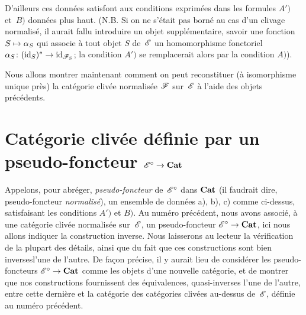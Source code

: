 D'ailleurs ces donn\'ees satisfont aux conditions exprim\'ees dans
les formules $A')$ et~$B)$ donn\'ees plus haut. (N.B. Si on ne
s'\'etait pas born\'e au cas d'un clivage normalis\'e, il aurait
fallu introduire un objet suppl\'ementaire, savoir une fonction
$S\mto \alpha_S$ qui associe \`a tout objet $S$ de~$\cal{E}$ un
homomorphisme fonctoriel $\alpha_S\colon (\id_S)^*\to
\id_{\cal{F}_S}$; la condition $A')$ se remplacerait alors par la
condition $A)$).

Nous
allons montrer maintenant comment on peut reconstituer (\`a
isomorphisme unique pr\`es) la cat\'egorie cliv\'ee
normalis\'ee $\cal{F}$ sur~$\cal{E}$ \`a l'aide des objets
pr\'ec\'edents.

\section[Cat\'egorie cliv\'ee d\'efinie par un pseudo-foncteur]{Cat\'egorie cliv\'ee d\'efinie par un pseudo-foncteur
$\mathcal{E}^\circ\to\Cat$} \label{VI.8}

Appelons, pour abr\'eger, \emph{pseudo-foncteur} de~$\cal{E}^\circ$
dans $\mathbf{Cat}$ (il faudrait dire, pseudo-foncteur \emph{normalisé}),
un ensemble de donn\'ees a), b), c) comme ci-dessus, satisfaisant les
conditions $A')$ et $B)$. Au num\'ero pr\'ec\'edent, nous avons
associ\'e, \`a une cat\'egorie cliv\'ee normalis\'ee
sur~$\cal{E}$, un pseudo-foncteur $\cal{E}^\circ\to\Cat$, ici nous
allons indiquer la construction inverse. Nous laisserons au lecteur la
v\'erification de la plupart des d\'etails, ainsi que du fait que
ces constructions sont bien \og inverses\fg l'une de l'autre. De
fa\c con pr\'ecise, il y aurait lieu de consid\'erer les
pseudo-foncteurs $\cal{E}^\circ\to\Cat$ comme les objets d'une
nouvelle cat\'egorie, et de montrer que nos constructions
fournissent des \'equivalences, quasi-inverses l'une de l'autre,
entre cette derni\`ere et la cat\'egorie des cat\'egories
cliv\'ees au-dessus de~$\cal{E}$, d\'efinie au num\'ero
pr\'ec\'edent.

